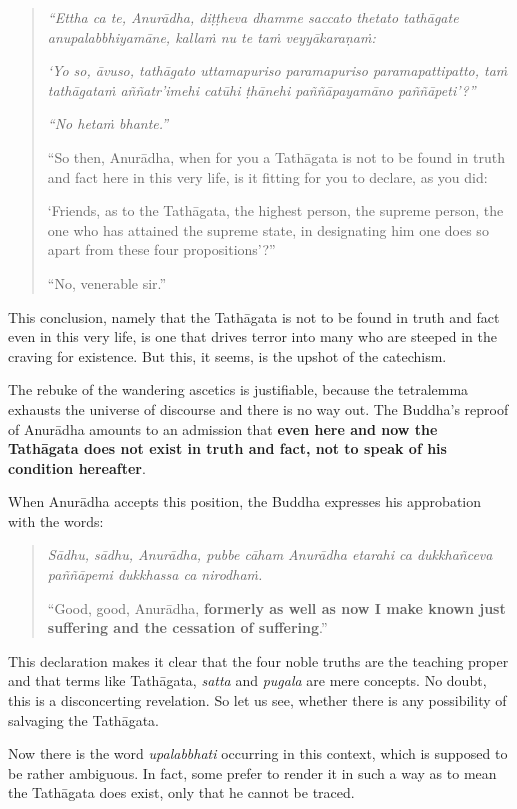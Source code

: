 \enlargethispage{\baselineskip}

\begin{quote}
\emph{``Ettha ca te, Anurādha, diṭṭheva dhamme saccato thetato tathāgate anupalabbhiyamāne, kallaṁ nu te taṁ veyyākaraṇaṁ:}

\emph{`Yo so, āvuso, tathāgato uttamapuriso paramapuriso paramapattipatto, taṁ tathāgataṁ aññatr'imehi catūhi ṭhānehi paññāpayamāno paññāpeti'?''}

\emph{``No hetaṁ bhante.''}

``So then, Anurādha, when for you a Tathāgata is not to be found in truth and fact here in this very life, is it fitting for you to declare, as you did:

`Friends, as to the Tathāgata, the highest person, the supreme person, the one who has attained the supreme state, in designating him one does so apart from these four propositions'?''

``No, venerable sir.''
\end{quote}

This conclusion, namely that the Tathāgata is not to be found in truth and fact even in this very life, is one that drives terror into many who are steeped in the craving for existence. But this, it seems, is the upshot of the catechism.

The rebuke of the wandering ascetics is justifiable, because the tetralemma exhausts the universe of discourse and there is no way out. The Buddha's reproof of Anurādha amounts to an admission that \textbf{even here and now the Tathāgata does not exist in truth and fact, not to speak of his condition hereafter}.

When Anurādha accepts this position, the Buddha expresses his approbation with the words:

\begin{quote}
\emph{Sādhu, sādhu, Anurādha, pubbe cāham Anurādha etarahi ca dukkhañceva paññāpemi dukkhassa ca nirodhaṁ.}

``Good, good, Anurādha, \textbf{formerly as well as now I make known just suffering and the cessation of suffering}.''
\end{quote}

This declaration makes it clear that the four noble truths are the teaching proper and that terms like Tathāgata, \emph{satta} and \emph{pugala} are mere concepts. No doubt, this is a disconcerting revelation. So let us see, whether there is any possibility of salvaging the Tathāgata.

Now there is the word \emph{upalabbhati} occurring in this context, which is supposed to be rather ambiguous. In fact, some prefer to render it in such a way as to mean the Tathāgata does exist, only that he cannot be traced.

